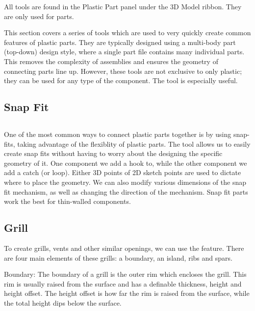 \begin{where-to-find}
All tools are found in the Plastic Part panel under the 3D Model ribbon. They are only used for parts.
\end{where-to-find}

\mediumdifficulty


This section covers a series of tools which are used to very quickly create common features of plastic parts. They are typically designed using a multi-body part (top-down) design style, where a single part file contains many individual parts. This removes the complexity of assemblies and ensures the geometry of connecting parts line up. However, these tools are not exclusive to only plastic; they can be used for any type of the component. The  tool is especially useful.

\subsection{Snap Fit}

$ $

One of the most common ways to connect plastic parts together is by using snap-fits, taking advantage of the flexiblity of plastic parts. The  tool allows us to easily create snap fits without having to worry about the designing the specific geometry of it. One component we add a hook to, while the other component we add a catch (or loop). Either 3D points of 2D sketch points are used to dictate where to place the geometry. We can also modify various dimensions of the snap fit mechanism, as well as changing the direction of the mechanism. Snap fit parts work the best for thin-walled components.

\subsection{Grill}



To create grills, vents and other similar openings, we can use the  feature. There are four main elements of these grills: a boundary, an island, ribs and spars.

Boundary:
The boundary of a grill is the outer rim which encloses the grill. This rim is usually raised from the surface and has a definable thickness, height and height offset. The height offset is how far the rim is raised from the surface, while the total height dips below the surface.

